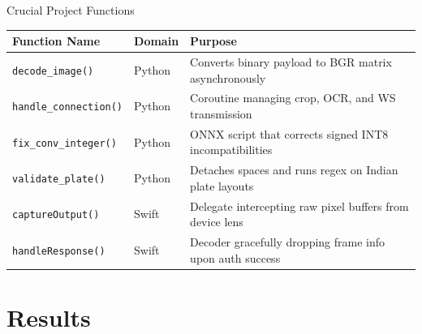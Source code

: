 \documentclass[aspectratio=169,11pt]{beamer}
\begin{document}
\begin{frame}{Crucial Project Functions}
\footnotesize
\begin{table}[H]
\centering
\renewcommand{\arraystretch}{1.2}
\begin{tabular}{p{3.5cm} p{1.8cm} p{8.5cm}}
\toprule
\textbf{Function Name} & \textbf{Domain} & \textbf{Purpose} \\
\midrule
\texttt{decode\_image()} & Python & Converts binary payload to BGR matrix asynchronously \\
\texttt{handle\_connection()} & Python & Coroutine managing crop, OCR, and WS transmission \\
\texttt{fix\_conv\_integer()} & Python & ONNX script that corrects signed INT8 incompatibilities \\
\texttt{validate\_plate()} & Python & Detaches spaces and runs regex on Indian plate layouts \\
\texttt{captureOutput()} & Swift & Delegate intercepting raw pixel buffers from device lens \\
\texttt{handleResponse()} & Swift & Decoder gracefully dropping frame info upon auth success \\
\bottomrule
\end{tabular}
\end{table}
\end{frame}

\section{Results}
\end{document}
